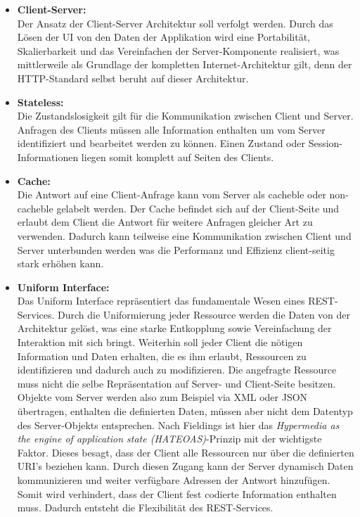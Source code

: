 \documentclass[fleqn,10.5pt,ngerman]{SelfArx}
\begin{document}
\begin{itemize}
	\item \textbf{Client-Server:}\\ Der Ansatz der Client-Server Architektur soll verfolgt werden. Durch das Lösen der UI von den Daten der Applikation wird eine Portabilität, Skalierbarkeit und das Vereinfachen der Server-Komponente realisiert, was mittlerweile als Grundlage der kompletten Internet-Architektur gilt, denn der HTTP-Standard selbst beruht auf dieser Architektur.
	\item \textbf{Stateless:}\\ Die Zustandslosigkeit gilt für die Kommunikation zwischen Client und Server. Anfragen des Clients müssen alle Information enthalten um vom Server identifiziert und bearbeitet werden zu können. Einen Zustand oder Session-Informationen liegen somit komplett auf Seiten des Clients.
	\item \textbf{Cache:}\\ Die Antwort auf eine Client-Anfrage kann vom Server als cacheble oder non-cacheble gelabelt werden. Der Cache befindet sich auf der Client-Seite und erlaubt dem Client die Antwort für weitere Anfragen gleicher Art zu verwenden. Dadurch kann teilweise eine Kommunikation zwischen Client und Server unterbunden werden was die Performanz und Effizienz client-seitig stark erhöhen kann.
	\item \textbf{Uniform Interface:}\\ Das Uniform Interface repräsentiert das fundamentale Wesen eines REST-Services. Durch die Uniformierung jeder Ressource werden die Daten von der Architektur gelöst, was eine starke Entkopplung sowie Vereinfachung der Interaktion mit sich bringt. Weiterhin soll jeder Client die nötigen Information und Daten erhalten, die es ihm erlaubt, Ressourcen zu identifizieren und dadurch auch zu modifizieren. Die angefragte Ressource muss nicht die selbe Repräsentation auf Server- und Client-Seite besitzen. Objekte vom Server werden also zum Beispiel via XML oder JSON übertragen, enthalten die definierten Daten, müssen aber nicht dem Datentyp des Server-Objekts entsprechen. Nach Fieldings ist hier das \textit{Hypermedia as the engine of application state (HATEOAS)}-Prinzip mit der wichtigste Faktor. Dieses besagt, dass der Client alle Ressourcen nur über die definierten URI's beziehen kann. Durch diesen Zugang kann der Server dynamisch Daten kommunizieren und weiter verfügbare Adressen der Antwort hinzufügen. Somit wird verhindert, dass der Client fest codierte Information enthalten muss. Dadurch entsteht die Flexibilität des REST-Services.

\end{itemize}
\end{document}

